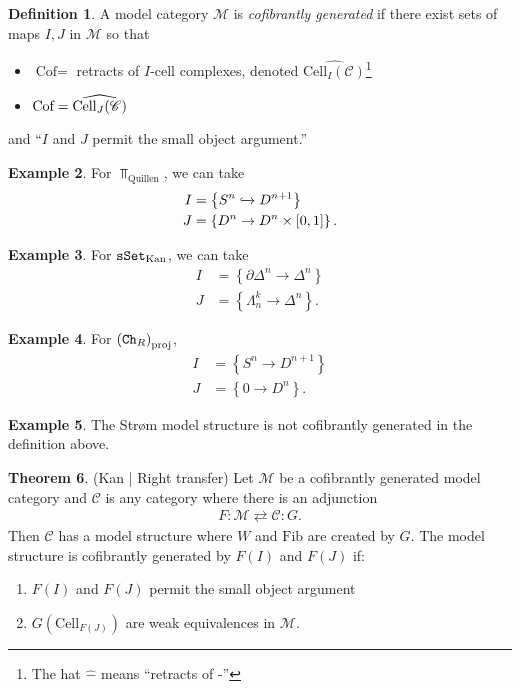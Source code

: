 \documentclass[12pt]{amsart}
\theoremstyle{definition}
\newtheorem{theorem}{Theorem}[section]
\newtheorem{definition}[theorem]{Definition}
\newtheorem{example}[theorem]{Example}
\let\del\partial
\providecommand{\Cof}{\text{Cof}}
\providecommand{\Fib}{\text{Fib}}
\providecommand{\Cell}{\text{Cell}}
\begin{document}
\begin{definition} A model category $\mathcal{M}$ is \textit{cofibrantly generated} if there exist sets of maps $I,J$ in $\mathcal{M}$ so that
\begin{itemize}
    \item $\Cof=$ retracts of $I$-cell complexes, denoted $\widehat{\Cell_I(\mathscr{C})}$\footnote{The hat $\widehat{-}$ means ``retracts of -''}
    \item $\text{\Cof} = \widehat{\Cell_J(\mathscr{C})}$
\end{itemize}
and ``$I$ and $J$ permit the small object argument.''
\end{definition}

\begin{example} For $\Top_\text{Quillen}$, we can take
\begin{align*}
    I &=\left\{ S^n \xhookrightarrow{} D^{n+1} \right\} \\
    J &= \left\{ D^n \to D^n \times [0,1] \right\}.
\end{align*}
\end{example}

\begin{example} For $\texttt{sSet}_\text{Kan}$, we can take
\begin{align*}
    I &= \left\{ \del\Delta^n \to \Delta^n \right\} \\
    J &= \left\{ \Lambda_n^k \to \Delta^n \right\}.
\end{align*}
\end{example}

\begin{example} For $\left( \texttt{Ch}_R \right)_\text{proj}$,
\begin{align*}
    I &= \left\{ S^n \to D^{n+1} \right\} \\
    J &= \left\{ 0 \to D^n \right\}.
\end{align*}
\end{example}

\begin{example} The Str{\o}m model structure is not cofibrantly generated in the definition above.
\end{example}

\begin{theorem} (Kan | Right transfer) Let $\mathcal{M}$ be a cofibrantly generated model category and $\mathscr{C}$ is any category where there is an adjunction
\begin{align*}
    F: \mathcal{M} \rightleftarrows \mathscr{C}: G.
\end{align*}
Then $\mathscr{C}$ has a model structure where $W$ and $\Fib$ are created by $G$. The model structure is cofibrantly generated by $F(I)$ and $F(J)$ if:
\begin{enumerate}
    \item $F(I)$ and $F(J)$ permit the small object argument
    \item $G \left( \Cell_{F(J)} \right)$ are weak equivalences in $\mathcal{M}$.
\end{enumerate}
\end{theorem}
\end{document}
